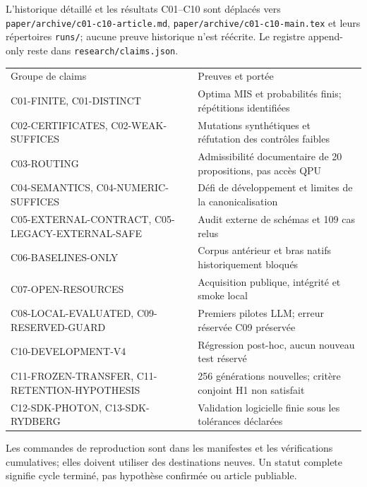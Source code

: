 \documentclass[11pt]{article}
\begin{document}
L'historique détaillé et les résultats C01–C10 sont déplacés vers \texttt{paper/archive/c01-c10-article.md}, \texttt{paper/archive/c01-c10-main.tex} et leurs répertoires \texttt{runs/}; aucune preuve historique n'est réécrite. Le registre append-only reste dans \texttt{research/claims.json}.

\begin{center}\small
\begin{tabularx}{\textwidth}{@{}XX@{}}
\hline
Groupe de claims & Preuves et portée\\
C01-FINITE, C01-DISTINCT & Optima MIS et probabilités finis; répétitions identifiées\\
C02-CERTIFICATES, C02-WEAK-SUFFICES & Mutations synthétiques et réfutation des contrôles faibles\\
C03-ROUTING & Admissibilité documentaire de 20 propositions, pas accès QPU\\
C04-SEMANTICS, C04-NUMERIC-SUFFICES & Défi de développement et limites de la canonicalisation\\
C05-EXTERNAL-CONTRACT, C05-LEGACY-EXTERNAL-SAFE & Audit externe de schémas et 109 cas relus\\
C06-BASELINES-ONLY & Corpus antérieur et bras natifs historiquement bloqués\\
C07-OPEN-RESOURCES & Acquisition publique, intégrité et smoke local\\
C08-LOCAL-EVALUATED, C09-RESERVED-GUARD & Premiers pilotes LLM; erreur réservée C09 préservée\\
C10-DEVELOPMENT-V4 & Régression post-hoc, aucun nouveau test réservé\\
C11-FROZEN-TRANSFER, C11-RETENTION-HYPOTHESIS & 256 générations nouvelles; critère conjoint H1 non satisfait\\
C12-SDK-PHOTON, C13-SDK-RYDBERG & Validation logicielle finie sous les tolérances déclarées\\
\hline
\end{tabularx}
\end{center}

Les commandes de reproduction sont dans les manifestes et les vérifications cumulatives; elles doivent utiliser des destinations neuves. Un statut complete signifie cycle terminé, pas hypothèse confirmée ou article publiable.
\end{document}
